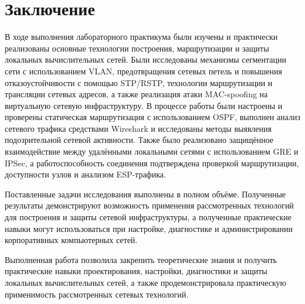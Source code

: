 \chapter*{Заключение}
\label{ch:conclusion}

В ходе выполнения лабораторного практикума были изучены и практически реализованы основные технологии построения, маршрутизации и защиты локальных вычислительных сетей. Были исследованы механизмы сегментации сети с использованием VLAN, предотвращения сетевых петель и повышения отказоустойчивости с помощью STP/RSTP, технологии маршрутизации и трансляции сетевых адресов, а также реализация атаки MAC-spoofing на виртуальную сетевую инфраструктуру.
В процессе работы были настроены и проверены статическая маршрутизация с использованием OSPF, выполнен анализ сетевого трафика средствами Wireshark и исследованы методы выявления подозрительной сетевой активности. Также было реализовано защищённое взаимодействие между удалёнными локальными сетями с использованием GRE и IPSec, а работоспособность соединения подтверждена проверкой маршрутизации, доступности узлов и анализом ESP-трафика.

Поставленные задачи исследования выполнены в полном объёме. Полученные результаты демонстрируют возможность применения рассмотренных технологий для построения и защиты сетевой инфраструктуры, а полученные практические навыки могут использоваться при настройке, диагностике и администрировании корпоративных компьютерных сетей.

Выполненная работа позволила закрепить теоретические знания и получить практические навыки проектирования, настройки, диагностики и защиты локальных вычислительных сетей, а также продемонстрировала практическую применимость рассмотренных сетевых технологий.

